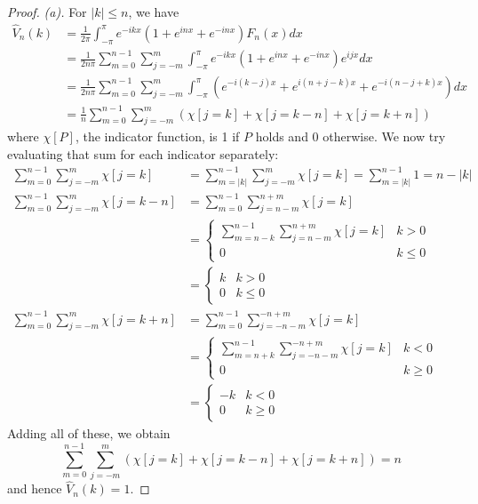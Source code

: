 \documentclass{article}
\theoremstyle{definition} %
\numberwithin{thm}{section} %
\theoremstyle{definition} %
\begin{document}
\begin{proof}
\textit{(a).} For $|k| \leq n$, we have
\begin{align*}
    \hat{V}_n(k)
    &= \frac{1}{2\pi}\int_{-\pi}^\pi 
    e^{-ikx}(1 + e^{inx} + e^{-inx}) F_n(x)dx \\
    &= \frac{1}{2n\pi}\sum_{m=0}^{n-1} 
    \sum_{j=-m}^{m}\int_{-\pi}^\pi 
    e^{-ikx}(1 + e^{inx} + e^{-inx}) e^{ijx}dx \\
    &= \frac{1}{2n\pi}\sum_{m=0}^{n-1} 
    \sum_{j=-m}^{m}\int_{-\pi}^\pi 
    (e^{-i(k - j)x} + e^{i(n + j - k)x} + e^{-i(n - j + k)x})dx \\
    &= \frac{1}{n}\sum_{m=0}^{n-1}\sum_{j=-m}^{m}
    (\chi[j = k] + \chi[j = k - n] + \chi[j = k + n])
\end{align*}
where $\chi[P]$, the indicator function, is 1 if $P$ holds and 0 otherwise. 
We now try evaluating that sum for each indicator separately:
\begin{align*}
    \sum_{m=0}^{n-1}\sum_{j=-m}^{m}\chi[j = k] 
    &= \sum_{m=|k|}^{n-1}\sum_{j=-m}^{m}\chi[j = k] 
    = \sum_{m=|k|}^{n-1} 1 
    = n - |k| \\
    \sum_{m=0}^{n-1}\sum_{j=-m}^{m}\chi[j = k - n]
    &=  \sum_{m=0}^{n-1}\sum_{j=n-m}^{n+m}\chi[j = k] \\
    &= \begin{cases}
        \sum_{m=n - k}^{n-1}\sum_{j=n-m}^{n+m}\chi[j = k] & k > 0\\
        0 & k \leq 0
    \end{cases} \\
    &= \begin{cases}
        k & k > 0\\
        0 & k \leq 0
    \end{cases} \\
    \sum_{m=0}^{n-1}\sum_{j=-m}^{m}\chi[j = k + n]
    &=  \sum_{m=0}^{n-1}\sum_{j=-n-m}^{-n+m}\chi[j = k] \\
    &= \begin{cases}
        \sum_{m=n + k}^{n-1}\sum_{j=-n-m}^{-n+m}\chi[j = k] & k < 0\\
        0 & k \geq 0
    \end{cases} \\
    &= \begin{cases}
        -k & k < 0\\
        0 & k \geq 0
    \end{cases}
\end{align*}
Adding all of these, we obtain
\[
    \sum_{m=0}^{n-1}\sum_{j=-m}^{m}
    (\chi[j = k] + \chi[j = k - n] + \chi[j = k + n]) = n
\]
and hence $\hat{V}_n(k) = 1$.


\end{proof}
\end{document}
